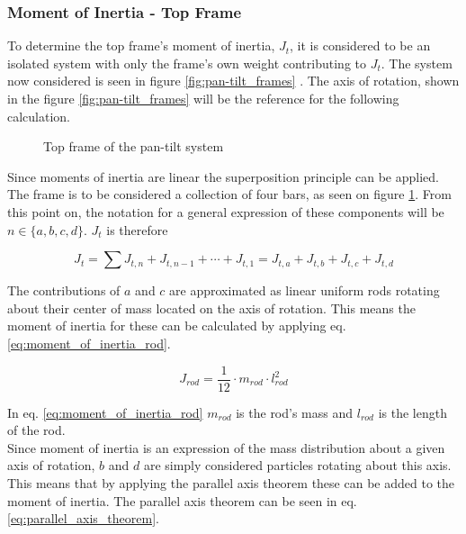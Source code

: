 \documentclass[../../main]{subfiles}
\begin{document}
\subsubsection{Moment of Inertia - Top Frame}
\label{sec:Top_frame_inertia}
To determine the top frame's moment of inertia, $J_{t}$, it is considered to be an isolated system with only the frame's own weight contributing to $J_{t}$. The system now considered is seen in figure \ref{fig:pan-tilt_frames} . The axis of rotation, shown in the figure \ref{fig:pan-tilt_frames}  will be the reference for the following calculation.\\

\begin{figure}[H]
  \centering
  
  \caption{Top frame of the pan-tilt system}
  \label{fig:TopFrame}
\end{figure}

Since moments of inertia are linear the superposition principle can be applied. The frame is to be considered a collection of four bars, as seen on figure \ref{fig:TopFrame}. From this point on, the notation for a general expression of these components will be $n \in \{a,b,c,d\}$. $J_t$ is therefore

\begin{equation}
  \label{eq:Top_frame_total_inertia_formula}
  J_t = \sum J_{t,n} + J_{t,n-1} + \dotsb + J_{t,1} = J_{t,a} + J_{t,b} + J_{t,c} + J_{t,d}
\end{equation}

The contributions of $a$ and $c$ are approximated as linear uniform rods rotating about their center of mass located on the axis of rotation. This means the moment of inertia for these can be calculated by applying eq. \eqref{eq:moment_of_inertia_rod}.

\begin{equation}
  \label{eq:moment_of_inertia_rod}
  J_{rod}=\frac{1}{12}\cdot m_{rod} \cdot l_{rod}^2
\end{equation}

In eq. \eqref{eq:moment_of_inertia_rod} $m_{rod}$ is the rod's mass and $l_{rod}$ is the length of the rod.
\\

Since moment of inertia is an expression of the mass distribution about a given axis of rotation, $b$ and $d$ are simply considered particles rotating about this axis. This means that by applying the parallel axis theorem these can be added to the moment of inertia. The parallel axis theorem can be seen in eq. \eqref{eq:parallel_axis_theorem}.
\end{document}
